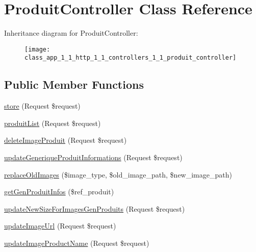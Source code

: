 \hypertarget{class_app_1_1_http_1_1_controllers_1_1_produit_controller}{}\section{Produit\+Controller Class Reference}
\label{class_app_1_1_http_1_1_controllers_1_1_produit_controller}
Inheritance diagram for Produit\+Controller\+:\begin{figure}[H]
\begin{center}
\leavevmode
\texttt{[image: class\_app\_1\_1\_http\_1\_1\_controllers\_1\_1\_produit\_controller]}
\end{center}
\end{figure}
\subsection*{Public Member Functions}
\begin{DoxyCompactItemize}
\item 
\mbox{\hyperlink{class_app_1_1_http_1_1_controllers_1_1_produit_controller_a9ef485163104597c12185b53cdacf638}{store}} (Request \$request)
\item 
\mbox{\hyperlink{class_app_1_1_http_1_1_controllers_1_1_produit_controller_ad3dec22746a70b0e4c334150155974d0}{produit\+List}} (Request \$request)
\item 
\mbox{\hyperlink{class_app_1_1_http_1_1_controllers_1_1_produit_controller_a33c98c731be9781db41b0295ed63f2b1}{delete\+Image\+Produit}} (Request \$request)
\item 
\mbox{\hyperlink{class_app_1_1_http_1_1_controllers_1_1_produit_controller_a8d1574e3ace3b731f8118303600d3cf2}{update\+Generique\+Produit\+Informations}} (Request \$request)
\item 
\mbox{\hyperlink{class_app_1_1_http_1_1_controllers_1_1_produit_controller_a11adda9a742ef9f7a01b4709cbf63f16}{replace\+Old\+Images}} (\$image\+\_\+type, \$old\+\_\+image\+\_\+path, \$new\+\_\+image\+\_\+path)
\item 
\mbox{\hyperlink{class_app_1_1_http_1_1_controllers_1_1_produit_controller_a2c192652b30f42ebb5e7e0529822f8e6}{get\+Gen\+Produit\+Infos}} (\$ref\+\_\+produit)
\item 
\mbox{\hyperlink{class_app_1_1_http_1_1_controllers_1_1_produit_controller_af2e34d5afd9726d5e0df41c2bf24d043}{update\+New\+Size\+For\+Images\+Gen\+Produits}} (Request \$request)
\item 
\mbox{\hyperlink{class_app_1_1_http_1_1_controllers_1_1_produit_controller_af581a6d07e2a36cb97bdb5ede2aa7992}{update\+Image\+Url}} (Request \$request)
\item 
\mbox{\hyperlink{class_app_1_1_http_1_1_controllers_1_1_produit_controller_ae5170491dffd8473f18abef82e97dae5}{update\+Image\+Product\+Name}} (Request \$request)
\end{DoxyCompactItemize}


